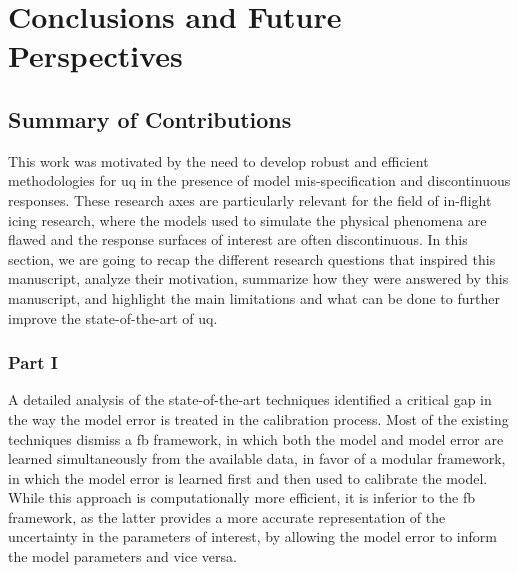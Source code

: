 %
\chapter{Conclusions and Future Perspectives}
\label{sec:conclusion}


\section{Summary of Contributions}
This work was motivated by the need to develop robust and efficient methodologies for \gls{uq} in the presence of model mis-specification and discontinuous responses. These research axes are particularly relevant for the field of in-flight icing research, where the models used to simulate the physical phenomena are flawed and the response surfaces of interest are often discontinuous. In this section, we are going to recap the different research questions that inspired this manuscript, analyze their motivation, summarize how they were answered by this manuscript, and highlight the main limitations and what can be done to further improve the state-of-the-art of \gls{uq}.

\subsection{Part I}

A detailed analysis of the state-of-the-art techniques identified a critical gap in the way the model error is treated in the calibration process. Most of the existing techniques dismiss a \gls{fb} framework, in which both the model and model error are learned simultaneously from the available data, in favor of a modular framework, in which the model error is learned first and then used to calibrate the model. While this approach is computationally more efficient, it is inferior to the \gls{fb} framework, as the latter provides a more accurate representation of the uncertainty in the parameters of interest, by allowing the model error to inform the model parameters and vice versa. 


